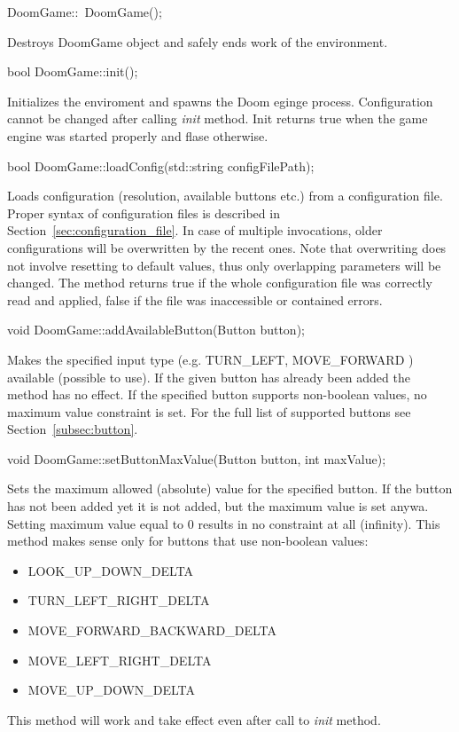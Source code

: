 \vspace{20pt}
\begin{clinee}
DoomGame::~DoomGame();
\end{clinee}

Destroys DoomGame object and safely ends work of the environment.

\vspace{20pt}
\begin{clinee}
bool DoomGame::init();
\end{clinee}

Initializes the enviroment and spawns the Doom eginge process. Configuration cannot be changed after calling \emph{init} method. Init returns true when the game engine was started properly and flase otherwise. 


\vspace{20pt}
\begin{clinee}
bool DoomGame::loadConfig(std::string configFilePath);
\end{clinee}

Loads configuration (resolution, available buttons etc.) from a configuration file. Proper syntax of configuration files is described in Section~\ref{sec:configuration_file}. In case of multiple invocations, older configurations will be overwritten by the recent ones. Note that overwriting does not involve resetting to default values, thus only overlapping parameters will be changed. The method returns true if the whole configuration file was correctly read and applied, false if the file was inaccessible or contained errors.


\vspace{20pt}
\begin{clinee}
void DoomGame::addAvailableButton(Button button);
\end{clinee}

Makes the specified input type (e.g. TURN\_LEFT, MOVE\_FORWARD ) available (possible to use). If the given button has already been added the method has no effect. If the specified button supports non-boolean values, no maximum value constraint is set. For the full list of supported buttons see Section~\ref{subsec:button}.


\begin{clinee}
void DoomGame::setButtonMaxValue(Button button, int maxValue);
\end{clinee}
Sets the maximum allowed (absolute) value for the specified button. If the button has not been added yet it is not added, but the maximum value is set anywa. Setting maximum value equal to 0 results in no constraint at all (infinity). This method makes sense only for buttons that use non-boolean values:  
	\begin{itemize}
		\item LOOK\_UP\_DOWN\_DELTA
		\item TURN\_LEFT\_RIGHT\_DELTA
		\item MOVE\_FORWARD\_BACKWARD\_DELTA
		\item MOVE\_LEFT\_RIGHT\_DELTA
		\item MOVE\_UP\_DOWN\_DELTA
 	\end{itemize}
This method will work and take effect even after call to \emph{init} method.

